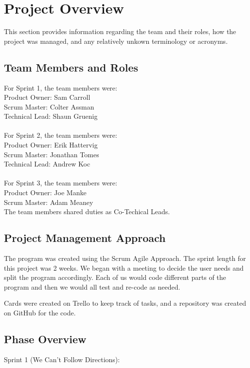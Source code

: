 

\chapter{Project Overview}
This section provides information regarding the team and their roles,
how the project was managed, and any relatively unkown terminology or
acronyms.



\section{Team Members and Roles}
For Sprint 1, the team members were:\\
\indent Product Owner: Sam Carroll\\
\indent Scrum Master: Colter Assman\\
\indent Technical Lead: Shaun Gruenig\\ \\
For Sprint 2, the team members were:\\
\indent Product Owner: Erik Hattervig \\
\indent Scrum Master: Jonathan Tomes\\
\indent Technical Lead: Andrew Koc\\ \\
For Sprint 3, the team members were:\\
\indent Product Owner: Joe Manke\\
\indent Scrum Master: Adam Meaney\\
\indent The team members shared duties as Co-Techical Leads.


\section{Project  Management Approach}

The program was created using the Scrum Agile Approach.
The sprint length for this project was 2 weeks. We began with a meeting to
decide the user needs and split the program accordingly. Each of us would code
different parts of the program and then we would all test and re-code as needed.

Cards were created on Trello to keep track of tasks, and a repository was created on GitHub for the code.

\section{Phase  Overview}
Sprint 1 (We Can't Follow Directions):

